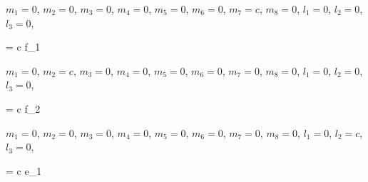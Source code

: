 $m_1 = 0$,
$m_2 = 0$,
$m_3 = 0$,
$m_4 = 0$,
$m_5 = 0$,
$m_6 = 0$,
$m_7 = c$,
$m_8 = 0$,
$l_1 = 0$,
$l_2 = 0$,
$l_3 = 0$,

\left[ f_2, f_2, f_2 \right] = c \cdot f_1


$m_1 = 0$,
$m_2 = c$,
$m_3 = 0$,
$m_4 = 0$,
$m_5 = 0$,
$m_6 = 0$,
$m_7 = 0$,
$m_8 = 0$,
$l_1 = 0$,
$l_2 = 0$,
$l_3 = 0$,

\left[ f_1, f_1, f_1 \right] = c \cdot f_2


$m_1 = 0$,
$m_2 = 0$,
$m_3 = 0$,
$m_4 = 0$,
$m_5 = 0$,
$m_6 = 0$,
$m_7 = 0$,
$m_8 = 0$,
$l_1 = 0$,
$l_2 = c$,
$l_3 = 0$,

\left[ e_1, f_1, f_2 \right] = c \cdot e_1
